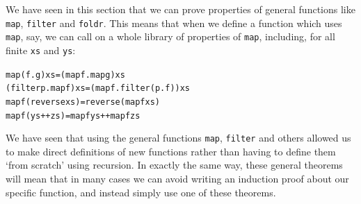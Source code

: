 We have seen in this section that we can prove properties of general
functions like \texttt{map}, \texttt{filter}
and \texttt{foldr}. This means that when we define a function which
uses \texttt{map}, say, we can call on a whole library of properties of
\texttt{map}, including, for all finite \texttt{xs} and \texttt{ys}:
\begin{alltt}
map (f . g) xs        = (map f . map g) xs
(filter p . map f) xs = (map f . filter (p . f)) xs
map f (reverse xs)    = reverse (map f xs)
map f (ys++zs)        = map f ys ++ map f zs
\end{alltt}
We have seen that
 using the general functions \texttt{map}, \texttt{filter} and others allowed us to
make direct definitions of new functions rather than having to define them `from scratch'
using recursion. In exactly the same way,
these general theorems will mean that in many cases we can avoid writing an
induction proof about our specific function, and instead simply use one of these theorems.  


